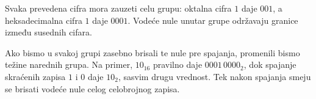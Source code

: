 
Svaka prevedena cifra mora zauzeti celu grupu: oktalna cifra $1$ daje $001$, a heksadecimalna cifra $1$ daje $0001$. Vodeće nule unutar grupe održavaju granice između susednih cifara.

Ako bismo u svakoj grupi zasebno brisali te nule pre spajanja, promenili bismo težine narednih grupa. Na primer, $10_{16}$ pravilno daje $0001\,0000_2$, dok spajanje skraćenih zapisa $1$ i $0$ daje $10_2$, sasvim drugu vrednost. Tek nakon spajanja smeju se brisati vodeće nule celog celobrojnog zapisa.
